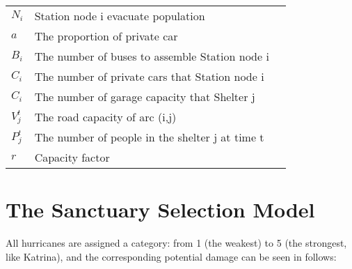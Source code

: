 \documentclass{mcmthesis}
\begin{document}
\begin{center}
\begin{longtable}{p{}p{}m{}}
$N_i$       & Station node i evacuate population                                        \\
$a$       & The proportion of private car                                           \\
$B_i$       & The number of buses to assemble Station node i                            \\
$C_i$       & The number of private cars that Station node i                            \\
$C_i$        & The number of garage capacity that Shelter j                             \\
$V_j^t$       & The road capacity of arc (i,j)                                            \\
$P_j^t$       & The number of people in the shelter j at time t                          \\
$r$       & Capacity factor                                                          \\ \hline

 \end{longtable}
 \end{center}


\section{The Sanctuary Selection Model}
All hurricanes are assigned a category: from 1 (the weakest) to 5 (the strongest, like Katrina), and the corresponding potential damage can be seen in  follows:
\end{document}
